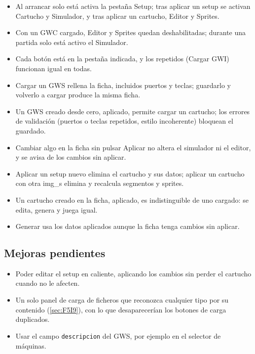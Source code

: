 \begin{itemize}
	\item Al arrancar solo está activa la pestaña Setup; tras aplicar un setup se activan Cartucho y Simulador, y tras aplicar un cartucho, Editor y Sprites.
	\item Con un GWC cargado, Editor y Sprites quedan deshabilitadas; durante una partida solo está activo el Simulador.
	\item Cada botón está en la pestaña indicada, y los repetidos (Cargar GWI) funcionan igual en todas.
	\item Cargar un GWS rellena la ficha, incluidos puertos y teclas; guardarlo y volverlo a cargar produce la misma ficha.
	\item Un GWS creado desde cero, aplicado, permite cargar un cartucho; los errores de validación (puertos o teclas repetidos, estilo incoherente) bloquean el guardado.
	\item Cambiar algo en la ficha sin pulsar Aplicar no altera el simulador ni el editor, y se avisa de los cambios sin aplicar.
	\item Aplicar un setup nuevo elimina el cartucho y sus datos; aplicar un cartucho con otra img\_s elimina y recalcula segmentos y sprites.
	\item Un cartucho creado en la ficha, aplicado, es indistinguible de uno cargado: se edita, genera y juega igual.
	\item Generar usa los datos aplicados aunque la ficha tenga cambios sin aplicar.
\end{itemize}

\subsection{Mejoras pendientes}
\label{sec:F5I12Pendientes}

\begin{itemize}
	\item Poder editar el setup en caliente, aplicando los cambios sin perder el cartucho cuando no le afecten.
	\item Un solo panel de carga de ficheros que reconozca cualquier tipo por su contenido (\ref{sec:F5I9}), con lo que desaparecerían los botones de carga duplicados.
	\item Usar el campo \texttt{descripcion} del GWS, por ejemplo en el selector de máquinas.
\end{itemize}